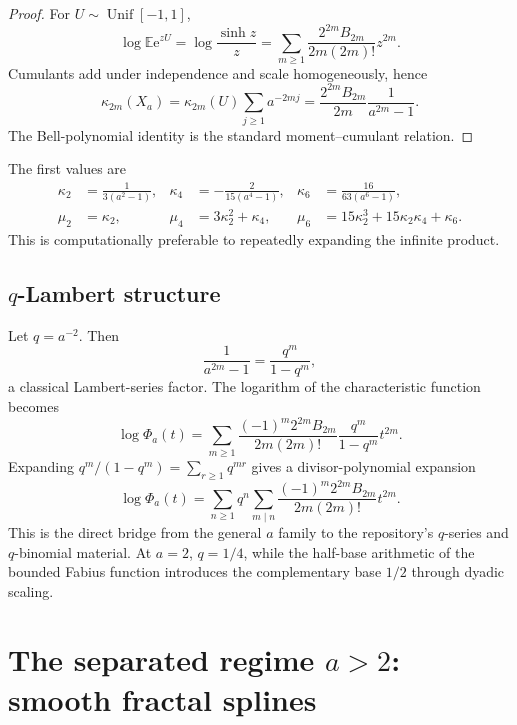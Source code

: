 \documentclass[11pt,oneside]{article}
\theoremstyle{definition}
\theoremstyle{remark}
\newcommand{\e}{\mathrm e}
\newcommand{\E}{\mathbb E}
\begin{document}
\begin{proof}
For $U\sim\operatorname{Unif}[-1,1]$,
\[
 \log\E\e^{zU}=\log\frac{\sinh z}{z}
 =\sum_{m\ge1}\frac{2^{2m}B_{2m}}{2m(2m)!}z^{2m}.
\]
Cumulants add under independence and scale homogeneously, hence
\[
 \kappa_{2m}(X_a)=\kappa_{2m}(U)\sum_{j\ge1}a^{-2mj}
 =\frac{2^{2m}B_{2m}}{2m}\frac1{a^{2m}-1}.
\]
The Bell-polynomial identity is the standard moment--cumulant relation.
\end{proof}

The first values are
\begin{align}
 \kappa_2&=\frac1{3(a^2-1)},
 &\kappa_4&=-\frac2{15(a^4-1)},
 &\kappa_6&=\frac{16}{63(a^6-1)},\label{eq:first-cumulants}\\
 \mu_2&=\kappa_2,
 &\mu_4&=3\kappa_2^2+\kappa_4,
 &\mu_6&=15\kappa_2^3+15\kappa_2\kappa_4+\kappa_6.
 \label{eq:first-moments}
\end{align}
This is computationally preferable to repeatedly expanding the infinite product.

\subsection{$q$-Lambert structure}

Let $q=a^{-2}$.  Then
\begin{equation}
 \frac1{a^{2m}-1}=\frac{q^m}{1-q^m},
 \label{eq:Lambert-factor}
\end{equation}
a classical Lambert-series factor.  The logarithm of the characteristic function becomes
\begin{equation}
 \log\Phi_a(t)=
 \sum_{m\ge1}
 \frac{(-1)^m2^{2m}B_{2m}}{2m(2m)!}
 \frac{q^m}{1-q^m}t^{2m}.
 \label{eq:logPhi-Lambert}
\end{equation}
Expanding $q^m/(1-q^m)=\sum_{r\ge1}q^{mr}$ gives a divisor-polynomial expansion
\begin{equation}
 \log\Phi_a(t)=\sum_{n\ge1}q^n
 \sum_{m\mid n}
 \frac{(-1)^m2^{2m}B_{2m}}{2m(2m)!}t^{2m}.
 \label{eq:divisor-polynomial}
\end{equation}
This is the direct bridge from the general $a$ family to the repository's $q$-series and
$q$-binomial material.  At $a=2$, $q=1/4$, while the half-base arithmetic of the bounded
Fabius function introduces the complementary base $1/2$ through dyadic scaling.

\section{The separated regime $a>2$: smooth fractal splines}
\label{sec:separated}
\end{document}
